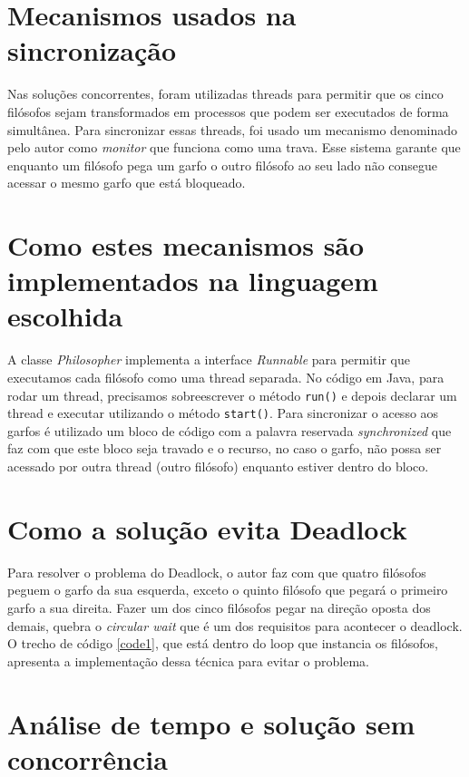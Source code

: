 \documentclass[conference]{IEEEtran}
\begin{document}
\section{Mecanismos usados na sincronização}
Nas soluções concorrentes, foram utilizadas threads para permitir que os cinco filósofos sejam transformados em processos que podem ser executados de forma simultânea.
Para sincronizar essas threads, foi usado um mecanismo denominado pelo autor como \textit{monitor}\cite{baeldung_java} que funciona como uma trava.
Esse sistema garante que enquanto um filósofo pega um garfo o outro filósofo ao seu lado não consegue acessar o mesmo garfo que está bloqueado.

\section{Como estes mecanismos são implementados na linguagem escolhida}

A classe \textit{Philosopher} implementa a interface \textit{Runnable} para permitir que executamos cada filósofo como uma thread separada.
No código em Java, para rodar um thread, precisamos sobreescrever o método \verb|run()| e depois declarar um thread e executar utilizando o método \verb|start()|.
Para sincronizar o acesso aos garfos é utilizado um bloco de código com a palavra reservada \textit{synchronized} que faz com que este bloco seja travado e o recurso, no caso o garfo, não possa ser acessado por outra thread (outro filósofo) enquanto estiver dentro do bloco.

\section{Como a solução evita Deadlock}

Para resolver o problema do Deadlock, o autor faz com que quatro filósofos peguem o garfo da sua esquerda, exceto o quinto filósofo que pegará o primeiro garfo a sua direita.
Fazer um dos cinco filósofos pegar na direção oposta dos demais, quebra o \textit{circular wait} que é um dos requisitos para acontecer o deadlock\cite{baeldung_java}.
O trecho de código \ref{code1}, que está dentro do loop que instancia os filósofos, apresenta a implementação dessa técnica para evitar o problema.



\section{Análise de tempo e solução sem concorrência}
\end{document}
